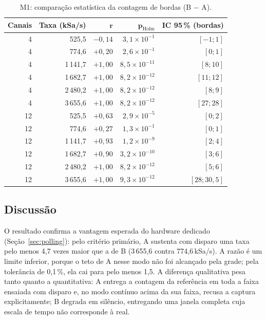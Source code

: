 \begin{table}[H]
  \centering
  \caption{M1: comparação estatística da contagem de bordas (B $-$ A).}
  \label{tab:m1-estat}
  \begin{tabular}{@{}rrrrr@{}}
    \toprule
    \textbf{Canais} & \textbf{Taxa (kSa/s)} & $\boldsymbol{r}$ &
    $\boldsymbol{p_{\mathrm{Holm}}}$ & \textbf{IC 95\,\% (bordas)} \\
    \midrule
    4 & 525{,}5 & $-0{,}14$ & $3{,}1 \times 10^{-1}$ & $[-1; 1]$ \\
    4 & 774{,}6 & $+0{,}20$ & $2{,}6 \times 10^{-1}$ & $[0; 1]$ \\
    4 & 1\,141{,}7 & $+1{,}00$ & $8{,}5 \times 10^{-11}$ & $[8; 10]$ \\
    4 & 1\,682{,}7 & $+1{,}00$ & $8{,}2 \times 10^{-12}$ & $[11; 12]$ \\
    4 & 2\,480{,}2 & $+1{,}00$ & $8{,}2 \times 10^{-12}$ & $[8; 9]$ \\
    4 & 3\,655{,}6 & $+1{,}00$ & $8{,}2 \times 10^{-12}$ & $[27; 28]$ \\
    \midrule
    12 & 525{,}5 & $+0{,}63$ & $2{,}9 \times 10^{-5}$ & $[0; 2]$ \\
    12 & 774{,}6 & $+0{,}27$ & $1{,}3 \times 10^{-1}$ & $[0; 1]$ \\
    12 & 1\,141{,}7 & $+0{,}93$ & $1{,}2 \times 10^{-9}$ & $[2; 4]$ \\
    12 & 1\,682{,}7 & $+0{,}90$ & $3{,}2 \times 10^{-10}$ & $[3; 6]$ \\
    12 & 2\,480{,}2 & $+1{,}00$ & $8{,}2 \times 10^{-12}$ & $[5; 6]$ \\
    12 & 3\,655{,}6 & $+1{,}00$ & $9{,}3 \times 10^{-12}$ & $[28; 30{,}5]$ \\
    \bottomrule
  \end{tabular}
\end{table}

\subsection{Discussão}

O resultado confirma a vantagem esperada do hardware dedicado
(Seção~\ref{sec:polling}): pelo critério primário, A sustenta com disparo uma
taxa pelo menos 4,7 vezes maior que a de B (3\,655,6 contra 774,6\,kSa/s).
A razão é um limite inferior, porque o teto de A nesse modo não foi alcançado
pela grade; pela tolerância de 0,1\,\%, ela cai para pelo menos 1,5. A
diferença qualitativa pesa tanto quanto a quantitativa: A entrega a contagem
da referência em toda a faixa ensaiada com disparo e, no modo contínuo acima
da sua faixa, recusa a captura explicitamente; B degrada em silêncio,
entregando uma janela completa cuja escala de tempo não corresponde à real.

